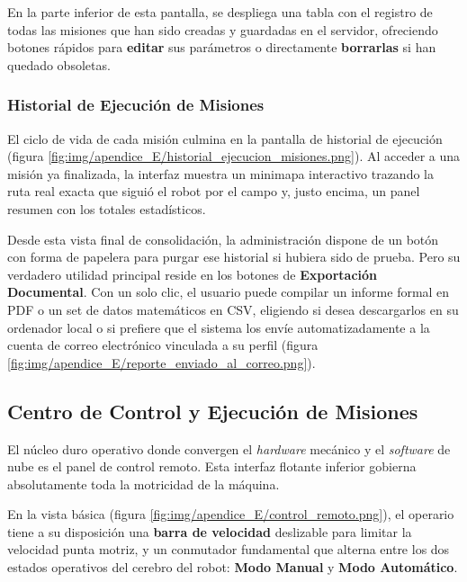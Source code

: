 En la parte inferior de esta pantalla, se despliega una tabla con el registro de todas las misiones que han sido creadas y guardadas en el servidor, ofreciendo botones rápidos para \textbf{editar} sus parámetros o directamente \textbf{borrarlas} si han quedado obsoletas.

\subsubsection{Historial de Ejecución de Misiones}
El ciclo de vida de cada misión culmina en la pantalla de historial de ejecución (figura \ref{fig:img/apendice_E/historial_ejecucion_misiones.png}). Al acceder a una misión ya finalizada, la interfaz muestra un minimapa interactivo trazando la ruta real exacta que siguió el robot por el campo y, justo encima, un panel resumen con los totales estadísticos. 

Desde esta vista final de consolidación, la administración dispone de un botón con forma de papelera para purgar ese historial si hubiera sido de prueba. Pero su verdadero utilidad principal reside en los botones de \textbf{Exportación Documental}. Con un solo clic, el usuario puede compilar un informe formal en PDF o un set de datos matemáticos en CSV, eligiendo si desea descargarlos en su ordenador local o si prefiere que el sistema los envíe automatizadamente a la cuenta de correo electrónico vinculada a su perfil (figura \ref{fig:img/apendice_E/reporte_enviado_al_correo.png}).




\subsection{Centro de Control y Ejecución de Misiones}
El núcleo duro operativo donde convergen el \textit{hardware} mecánico y el \textit{software} de nube es el panel de control remoto. Esta interfaz flotante inferior gobierna absolutamente toda la motricidad de la máquina.


En la vista básica (figura \ref{fig:img/apendice_E/control_remoto.png}), el operario tiene a su disposición una \textbf{barra de velocidad} deslizable para limitar la velocidad punta motriz, y un conmutador fundamental que alterna entre los dos estados operativos del cerebro del robot: \textbf{Modo Manual} y \textbf{Modo Automático}.

